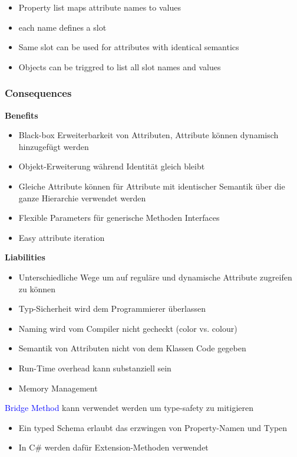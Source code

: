 \begin{itemize}
    \item Property list maps attribute names to values
    \item each name defines a slot
    \item Same slot can be used for attributes with identical semantics
    \item Objects can be triggred to list all slot names and values
\end{itemize}

\subsubsection{Consequences}
\textbf{Benefits}
\begin{itemize}
    \item Black-box Erweiterbarkeit von Attributen, Attribute können dynamisch hinzugefügt werden
    \item Objekt-Erweiterung während Identität gleich bleibt
    \item Gleiche Attribute können für Attribute mit identischer Semantik über die ganze Hierarchie verwendet werden
    \item Flexible Parameters für generische Methoden Interfaces
    \item Easy attribute iteration
\end{itemize}
\vspace{10pt}
\textbf{Liabilities}
\begin{itemize}
    \item Unterschiedliche Wege um auf reguläre und dynamische Attribute zugreifen zu können
    \item Typ-Sicherheit wird dem Programmierer überlassen
    \item Naming wird vom Compiler nicht gecheckt (color vs. colour)
    \item Semantik von Attributen nicht von dem Klassen Code gegeben
    \item Run-Time overhead kann substanziell sein
    \item Memory Management
\end{itemize}

\textcolor{blue}{Bridge Method} kann verwendet werden um type-safety zu mitigieren

\begin{itemize}
    \item Ein typed Schema erlaubt das erzwingen von Property-Namen und Typen
    \item In C\# werden dafür Extension-Methoden verwendet
\end{itemize}

